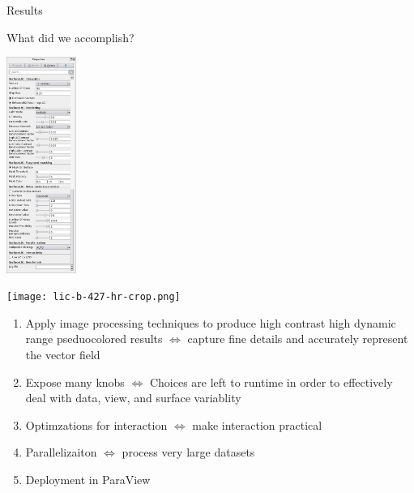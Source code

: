 \documentclass[notes]{beamer}
\begin{document}
\begin{frame}{Results}
        \begin{beamerboxesrounded}{What did we accomplish?}
        \begin{minipage}{0.2\linewidth}
        \begin{center}
        \includegraphics[width=0.9in]{pv-ui.png}
        \end{center}
        \end{minipage}
        \begin{minipage}{0.75\linewidth}
        \begin{center}
        \texttt{[image: lic-b-427-hr-crop.png]}
        \end{center}
        \vspace{-0.1in}
        \begin{enumerate}
        \item Apply image processing techniques to produce high contrast high dynamic range pseduocolored results $\Leftrightarrow$ capture fine details and accurately represent the vector field
        \item Expose many knobs $\Leftrightarrow$ Choices are left to runtime in order to effectively deal with data, view, and surface variablity
        \item Optimzations for interaction $\Leftrightarrow$ make interaction practical
        \item Parallelizaiton $\Leftrightarrow$ process very large datasets
        \item Deployment in ParaView
        \end{enumerate}
        \end{minipage}
      \end{beamerboxesrounded}
\end{frame}
\end{document}
